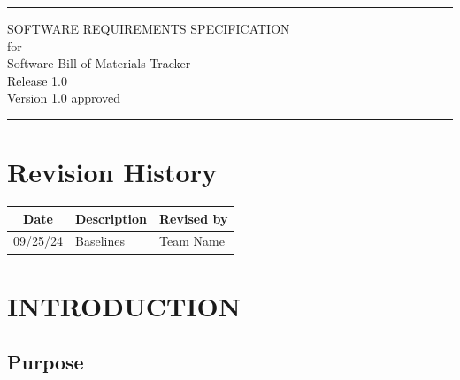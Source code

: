 \documentclass[letterpaper,12pt,oneside,listof=totoc]{scrreprt}
\date{\today}
\author{} %
\def\myversion{1.0 }
\begin{document}
\begin{titlepage}
\flushright
\rule{\textwidth}{5pt}\vskip1cm
\Huge{SOFTWARE REQUIREMENTS SPECIFICATION}\\
\vspace{1.5cm}
for\\
\vspace{1.5cm}
Software Bill of Materials Tracker\\                      %
\vspace{1.5cm}
\LARGE{Release 1.0\\}
\vspace{1.5cm}
\LARGE{Version \myversion approved\\}
\vfill
\rule{\textwidth}{5pt}
\end{titlepage}

\tableofcontents

\listoffigures

\listoftables

\chapter*{Revision History}

\begin{tabular}{| c | p{} | p{} |}
\hline
Date     & Description   & Revised by \\
\hline
09/25/24 & Baselines & Team Name \\
\hline
\end{tabular}


\chapter{INTRODUCTION}

\section{Purpose}
\end{document}
